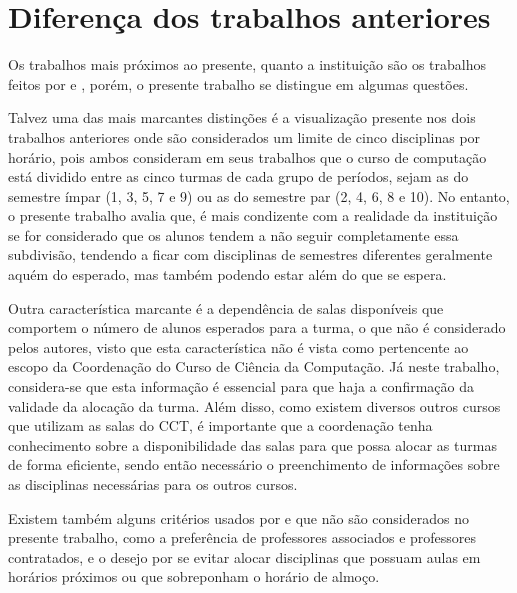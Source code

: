\section{Diferença dos trabalhos anteriores} \label{sec:diferenca} %

Os trabalhos mais próximos ao presente, quanto a instituição são os trabalhos feitos por  e , porém, o presente trabalho se distingue em algumas questões.

Talvez uma das mais marcantes distinções é a visualização presente nos dois trabalhos anteriores onde são considerados um limite de cinco disciplinas por horário, pois ambos consideram em seus trabalhos que o curso de computação está dividido entre as cinco turmas de cada grupo de períodos, sejam as do semestre ímpar (1, 3, 5, 7 e 9) ou as do semestre par (2, 4, 6, 8 e 10). No entanto, o presente trabalho avalia que, é mais condizente com a realidade da instituição se for considerado que os alunos tendem a não seguir completamente essa subdivisão, tendendo a ficar com disciplinas de semestres diferentes geralmente aquém do esperado, mas também podendo estar além do que se espera.

Outra característica marcante é a dependência de salas disponíveis que comportem o número de alunos esperados para a turma, o que não é considerado pelos autores, visto que esta característica não é vista como pertencente ao escopo da Coordenação do Curso de Ciência da Computação. Já neste trabalho, considera-se que esta informação é essencial para que haja a confirmação da validade da alocação da turma. Além disso, como existem diversos outros cursos que utilizam as salas do CCT, é importante que a coordenação tenha conhecimento sobre a disponibilidade das salas para que possa alocar as turmas de forma eficiente, sendo então necessário o preenchimento de informações sobre as disciplinas necessárias para os outros cursos.

Existem também alguns critérios usados por  e  que não são considerados no presente trabalho, como a preferência de professores associados e professores contratados, e o desejo por se evitar alocar disciplinas que possuam aulas em horários próximos ou que sobreponham o horário de almoço.
